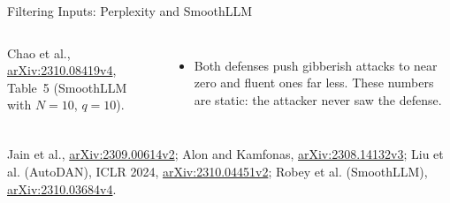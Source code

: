 \begin{frame}{Filtering Inputs: Perplexity and SmoothLLM}
\begin{columns}[T,onlytextwidth]
      \vspace{0.2em}
      {\scriptsize Chao et al., \href{https://arxiv.org/abs/2310.08419v4}{arXiv:2310.08419v4}, Table~5 (SmoothLLM with $N = 10$, $q = 10$).\par}
      \vspace{0.4em}
      \begin{itemize}\footnotesize\itemsep0.2em
        \item[\textcolor{red}{$\blacktriangleright$}] Both defenses push gibberish attacks to near zero and fluent ones far less. These numbers are static: the attacker never saw the defense.
      \end{itemize}
  \end{columns}
  \vspace{0.1em}
  {\scriptsize Jain et al., \href{https://arxiv.org/abs/2309.00614v2}{arXiv:2309.00614v2}; Alon and Kamfonas, \href{https://arxiv.org/abs/2308.14132v3}{arXiv:2308.14132v3}; Liu et al. (AutoDAN), ICLR 2024, \href{https://arxiv.org/abs/2310.04451v2}{arXiv:2310.04451v2}; Robey et al. (SmoothLLM), \href{https://arxiv.org/abs/2310.03684v4}{arXiv:2310.03684v4}.\par}
\end{frame}

